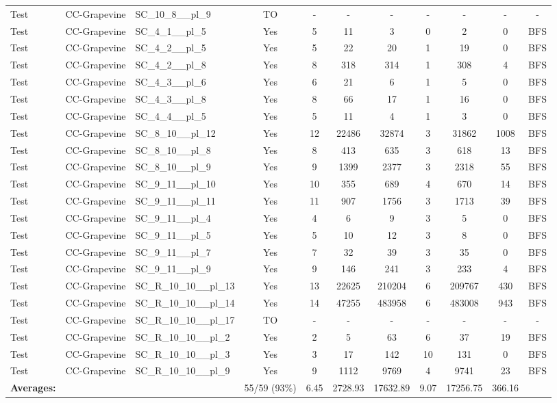 \documentclass{article}
\begin{document}
\begin{tabular}{lllcccccccc}
Test & CC-Grapevine & SC\_10\_8\_\_pl\_9 & TO & - & - & - & - & - & - & - \\
Test & CC-Grapevine & SC\_4\_1\_\_pl\_5 & Yes & 5 & 11 & 3 & 0 & 2 & 0 & BFS \\
Test & CC-Grapevine & SC\_4\_2\_\_pl\_5 & Yes & 5 & 22 & 20 & 1 & 19 & 0 & BFS \\
Test & CC-Grapevine & SC\_4\_2\_\_pl\_8 & Yes & 8 & 318 & 314 & 1 & 308 & 4 & BFS \\
Test & CC-Grapevine & SC\_4\_3\_\_pl\_6 & Yes & 6 & 21 & 6 & 1 & 5 & 0 & BFS \\
Test & CC-Grapevine & SC\_4\_3\_\_pl\_8 & Yes & 8 & 66 & 17 & 1 & 16 & 0 & BFS \\
Test & CC-Grapevine & SC\_4\_4\_\_pl\_5 & Yes & 5 & 11 & 4 & 1 & 3 & 0 & BFS \\
Test & CC-Grapevine & SC\_8\_10\_\_pl\_12 & Yes & 12 & 22486 & 32874 & 3 & 31862 & 1008 & BFS \\
Test & CC-Grapevine & SC\_8\_10\_\_pl\_8 & Yes & 8 & 413 & 635 & 3 & 618 & 13 & BFS \\
Test & CC-Grapevine & SC\_8\_10\_\_pl\_9 & Yes & 9 & 1399 & 2377 & 3 & 2318 & 55 & BFS \\
Test & CC-Grapevine & SC\_9\_11\_\_pl\_10 & Yes & 10 & 355 & 689 & 4 & 670 & 14 & BFS \\
Test & CC-Grapevine & SC\_9\_11\_\_pl\_11 & Yes & 11 & 907 & 1756 & 3 & 1713 & 39 & BFS \\
Test & CC-Grapevine & SC\_9\_11\_\_pl\_4 & Yes & 4 & 6 & 9 & 3 & 5 & 0 & BFS \\
Test & CC-Grapevine & SC\_9\_11\_\_pl\_5 & Yes & 5 & 10 & 12 & 3 & 8 & 0 & BFS \\
Test & CC-Grapevine & SC\_9\_11\_\_pl\_7 & Yes & 7 & 32 & 39 & 3 & 35 & 0 & BFS \\
Test & CC-Grapevine & SC\_9\_11\_\_pl\_9 & Yes & 9 & 146 & 241 & 3 & 233 & 4 & BFS \\
Test & CC-Grapevine & SC\_R\_10\_10\_\_pl\_13 & Yes & 13 & 22625 & 210204 & 6 & 209767 & 430 & BFS \\
Test & CC-Grapevine & SC\_R\_10\_10\_\_pl\_14 & Yes & 14 & 47255 & 483958 & 6 & 483008 & 943 & BFS \\
Test & CC-Grapevine & SC\_R\_10\_10\_\_pl\_17 & TO & - & - & - & - & - & - & - \\
Test & CC-Grapevine & SC\_R\_10\_10\_\_pl\_2 & Yes & 2 & 5 & 63 & 6 & 37 & 19 & BFS \\
Test & CC-Grapevine & SC\_R\_10\_10\_\_pl\_3 & Yes & 3 & 17 & 142 & 10 & 131 & 0 & BFS \\
Test & CC-Grapevine & SC\_R\_10\_10\_\_pl\_9 & Yes & 9 & 1112 & 9769 & 4 & 9741 & 23 & BFS \\
\textbf{Averages:} & & & 55/59 (93\%) & 6.45 & 2728.93 & 17632.89 & 9.07 & 17256.75 & 366.16 & \\
\bottomrule
\end{tabular}
\newpage
\end{document}
